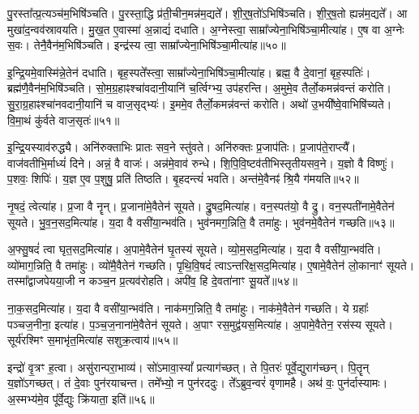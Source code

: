 पु॒रस्ता᳚त्प्र॒त्यञ्च॑म॒भिषि॑ञ्चति।
पु॒रस्ता॒द्धि प्र॑ती॒चीन॒मन्न॑म॒द्यते᳚।
शी॒र्॒ष॒तो॑\-ऽभिषि॑ञ्चति।
शी॒र्॒ष॒तो ह्यन्न॑म॒द्यते᳚।
आ मुखा॑द॒न्वव॑\-स्रावयति।
मु॒ख॒त ए॒वास्मा॑ अ॒न्नाद्यं॑ दधाति।
अ॒ग्नेस्त्वा॒ साम्रा᳚ज्येना॒\-भिषि॑ञ्चा॒मी\-त्या॑ह।
ए॒ष वा अ॒ग्नेः स॒वः।
तेनै॒वैन॑म॒भि\-षि॑ञ्चति।
इन्द्र॑स्य त्वा॒ साम्रा᳚ज्येना॒\-भिषि॑ञ्चा॒मी\-त्या॑ह॥५०॥

इ॒न्द्रि॒यमे॒वास्मि॑न्ने॒तेन॑ दधाति।
बृह॒स्पते᳚स्त्वा॒ साम्रा᳚ज्येना॒भि\-षि॑ञ्चा॒मीत्या॑ह।
ब्रह्म॒ वै दे॒वानां॒ बृह॒स्पतिः॑।
ब्रह्म॑णै॒वैन॑म॒भि\-षि॑ञ्चति।
सो॒म॒ग्र॒हाꣴश्चा॑वदानी॒यानि॑ च॒र्त्विग्भ्य॒ उप॑हरन्ति।
अ॒मुमे॒व तैर्लो॒कमन्न॑वन्तं करोति।
सु॒रा॒ग्र॒हाꣴश्चा॑नवदानी॒\-यानि॑ च वाज॒सृद्भ्यः॑।
इ॒ममे॒व तैर्लो॒कमन्न॑वन्तं करोति।
अथो॑ उ॒भयी᳚ष्वे॒वाभिषि॑च्यते।
वि॒मा॒थं कु॑र्वते वाज॒सृतः॑॥५१॥

इ॒न्द्रि॒यस्याव॑रुद्ध्यै।
अनि॑रुक्ताभिः प्रातः सव॒ने स्तु॑वते।
अनि॑रुक्तः प्र॒जा\-प॑तिः।
प्र॒जा\-प॑ते॒राप्त्यै᳚।
वाज॑वतीभि॒र्माध्यं॑ दिने।
अन्नं॒ वै वाजः॑।
अन्न॑मे॒वाव॑ रुन्धे।
शि॒पि॒वि॒ष्ट\-व॑तीभिस्तृतीयसव॒ने।
य॒ज्ञो वै विष्णुः॑।
प॒शवः॒ शिपिः॑।
य॒ज्ञ ए॒व प॒शुषु॒ प्रति॑ तिष्ठति।
बृ॒हदन्त्यं॑ भवति।
अन्त॑मे॒वैनꣴ॑ श्रि॒यै ग॑मयति॥५२॥\anuvakamend[अ॒श्ञी॒यादन्न॑स्यान्न॒स्याव॑रुद्ध्या॒ इन्द्र॑स्य त्वा॒ साम्रा᳚ज्येना॒भिषि॑ञ्चा॒मीत्या॑ह वाज॒सृतः॒ शिपि॒स्त्रीणि॑ च]

नृ॒षदं॒ त्वेत्या॑ह।
प्र॒जा वै नॄन्।
प्र॒जाना॑मे॒वैतेन॑ सूयते।
द्रु॒षद॒मित्या॑ह।
वन॒स्पत॑यो॒ वै द्रु।
वन॒स्पती॑नामे॒वैतेन॑ सूयते।
भु॒व॒न॒सद॒मित्या॑ह।
य॒दा वै वसी॑या॒न्भव॑ति।
भुव॑नमग॒न्निति॒ वै तमा॑हुः।
भुव॑नमे॒वैतेन॑ गच्छति॥५३॥

अ॒फ्सु॒षदं॑ त्वा घृत॒सद॒मित्या॑ह।
अ॒पामे॒वैतेन॑ घृ॒तस्य॑ सूयते।
व्यो॒म॒सद॒मित्या॑ह।
य॒दा वै वसी॑या॒न्भव॑ति।
व्यो॑माग॒न्निति॒ वै तमा॑हुः।
व्यो॑मै॒वैतेन॑ गच्छति।
पृ॒थि॒वि॒षदं॑ त्वा\-ऽन्तरिक्ष॒सद॒मित्या॑ह।
ए॒षामे॒वैतेन॑ लो॒कानाꣳ॑ सूयते।
तस्मा᳚द्वाजपेयया॒जी न कञ्च॒न प्र॒त्यव॑रोहति।
अपी॑व॒ हि दे॒वता॑नाꣳ सू॒यते᳚॥५४॥

ना॒क॒सद॒मित्या॑ह।
य॒दा वै वसी॑या॒न्भव॑ति।
नाक॑मग॒न्निति॒ वै तमा॑हुः।
नाक॑मे॒वैतेन॑ गच्छति।
ये ग्रहाः᳚ पञ्चज॒नीना॒ इत्या॑ह।
प॒ञ्च॒ज॒नाना॑मे॒वैतेन॑ सूयते।
अ॒पाꣳ रस॒मुद्व॑यस॒मि\-त्या॑ह।
अ॒पामे॒वैतेन॒ रस॑स्य सूयते।
सूर्य॑रश्मिꣳ स॒माभृ॑त॒मित्या॑ह सशुक्र॒त्वाय॑॥५५॥\anuvakamend[ग॒च्छ॒ति॒ सू॒यते॒ नव॑ च]

इन्द्रो॑ वृ॒त्रꣳ ह॒त्वा।
असु॑रान्परा॒भाव्य॑।
सो॑ऽमावा॒स्यां᳚ प्रत्याग॑च्छत्।
ते पि॒तरः॑ पूर्वे॒द्युराग॑च्छन्।
पि॒तॄन् य॒ज्ञो॑\-ऽगच्छत्।
तं दे॒वाः पुन॑रयाचन्त।
तमे᳚भ्यो॒ न पुन॑रददुः।
ते᳚ऽब्रुव॒न्वरं॑ वृणामहै।
अथ॑ वः॒ पुन॑र्दास्यामः।
अ॒स्मभ्य॑मे॒व पू᳚र्वे॒द्युः क्रि॑याता॒ इति॑॥५६॥

